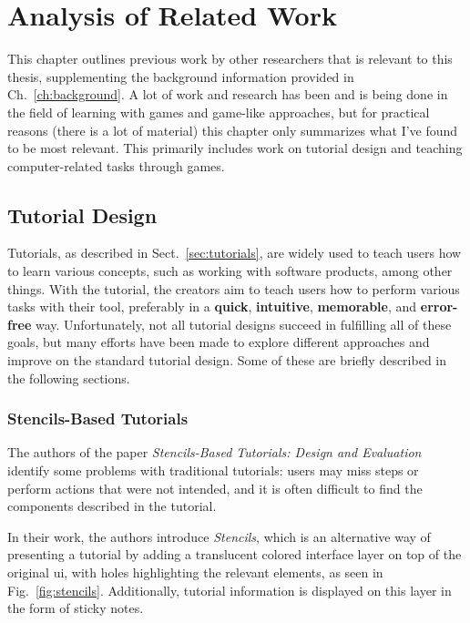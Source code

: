 \chapter{Analysis of Related Work}
\label{ch:related_work}
This chapter outlines previous work by other researchers that is relevant to this thesis, supplementing the background information provided in Ch.~\ref{ch:background}. A lot of work and research has been and is being done in the field of learning with games and game-like approaches, but for practical reasons (there is a lot of material) this chapter only summarizes what I've found to be most relevant. This primarily includes work on tutorial design and teaching computer-related tasks through games.

\section{Tutorial Design}
\label{sec:tutorial_design_related}
Tutorials, as described in Sect.~\ref{sec:tutorials}, are widely used to teach users how to learn various concepts, such as working with software products, among other things. With the tutorial, the creators aim to teach users how to perform various tasks with their tool, preferably in a \textbf{quick}, \textbf{intuitive}, \textbf{memorable}, and \textbf{error-free} way. Unfortunately, not all tutorial designs succeed in fulfilling all of these goals, but many efforts have been made to explore different approaches and improve on the standard tutorial design. Some of these are briefly described in the following sections.

\subsection{Stencils-Based Tutorials}
\label{sec:stencils}
The authors of the paper \emph{Stencils-Based Tutorials: Design and Evaluation}~\cite{kelleher:stencils} identify some problems with traditional tutorials: users may miss steps or perform actions that were not intended, and it is often difficult to find the components described in the tutorial.

\noindent
In their work, the authors introduce \emph{Stencils}, which is an alternative way of presenting a tutorial by adding a translucent colored interface layer on top of the original \gls{ui}, with holes highlighting the relevant elements, as seen in Fig.~\ref{fig:stencils}. Additionally, tutorial information is displayed on this layer in the form of sticky notes.

